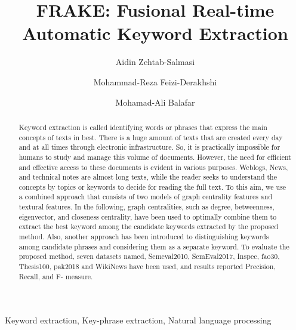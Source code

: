 \documentclass[3p]{elsarticle}
\begin{document}
\begin{frontmatter}

\title{
FRAKE: Fusional Real-time Automatic Keyword Extraction\\
}


\author[cominsys]{Aidin Zehtab-Salmasi}
\author[cominsys]{Mohammad-Reza Feizi-Derakhshi}

\author[UT]{Mohamad-Ali Balafar}


\address[cominsys]{Computerized Intelligence Systems Laboratory, Department of Computer Engineering, University of Tabriz, Tabriz, IRAN.}
\address[UT]{Department of Computer Engineering, University of Tabriz, Tabriz, IRAN.}

\begin{abstract}
Keyword extraction is called identifying words or phrases that express the main concepts of texts in best. There is a huge amount of texts that are created every day and at all times through electronic infrastructure. So, it is practically impossible for humans to study and manage this volume of documents. However, the need for efficient and effective access to these documents is evident in various purposes. Weblogs, News, and technical notes are almost long texts, while the reader seeks to understand the concepts by topics or keywords to decide for reading the full text. To this aim, we use a combined approach that consists of two models of graph centrality features and textural features. In the following, graph centralities, such as degree, betweenness, eigenvector, and closeness centrality, have been used to optimally combine them to extract the best keyword among the candidate keywords extracted by the proposed method. Also, another approach has been introduced to distinguishing keywords among candidate phrases and considering them as a separate keyword. To evaluate the proposed method, seven datasets named, Semeval2010, SemEval2017, Inspec, fao30, Thesis100, pak2018 and WikiNews have been used, and results reported Precision, Recall, and F- measure.

\end{abstract}

\begin{keyword}
Keyword extraction, Key-phrase extraction, Natural language processing
\end{keyword}

\end{frontmatter}
\end{document}
